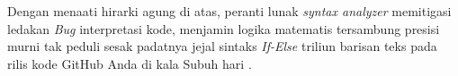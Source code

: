 Dengan menaati hirarki agung di atas, peranti lunak \textit{syntax analyzer} memitigasi ledakan \textit{Bug} interpretasi kode, menjamin logika matematis tersambung presisi murni tak peduli sesak padatnya jejal sintaks \textit{If-Else} triliun barisan teks pada rilis kode GitHub Anda di kala Subuh hari \cite{wiki_first_order_logic}.
